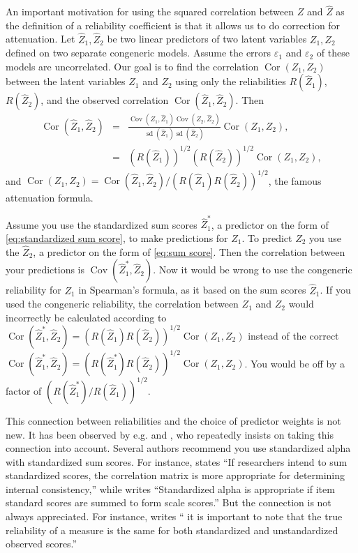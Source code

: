 \documentclass[twoside]{article}
\DeclareMathOperator{\sd}{sd}
\DeclareMathOperator{\Cor}{Cor}
\DeclareMathOperator{\Cov}{Cov}
\renewcommand{\sqrt}[1]{{(#1)^{1/2}}}
\begin{document}
An important motivation for using the squared
correlation between $Z$ and $\hat{Z}$ as the definition of a
reliability coefficient is that it allows us to do correction for
attenuation. Let $\hat{Z}_{1},\hat{Z}_{2}$ be two linear
predictors of two latent variables $Z_{1},Z_{2}$ defined on two separate
congeneric models. Assume the errors $\varepsilon_{1}$ and $\varepsilon_{2}$ of these models
are uncorrelated. Our goal is to find the correlation $\Cor(Z_{1},Z_{2})$
between the latent variables $Z_{1}$ and $Z_{2}$ using only the
reliabilities $ R(\hat{Z}_{1})$, $ R(\hat{Z}_{2})$,
and the observed correlation $\Cor(\hat{Z}_{1},\hat{Z}_{2})$.
Then
\begin{eqnarray*}
\Cor(\hat{Z}_{1},\hat{Z}_{2}) & = & \frac{\Cov(Z_{1},\hat{Z}_{1})\Cov(Z_{2},\hat{Z}_{2})}{\sd(\hat{Z}_{1})\sd(\hat{Z}_{2})}\Cor(Z_{1},Z_{2}),\\
 & = & \sqrt{ R(\hat{Z}_{1})}\sqrt{ R(\hat{Z}_{2})}\Cor(Z_{1},Z_{2}),
\end{eqnarray*}
and $\Cor(Z_{1},Z_{2})=\Cor(\hat{Z}_{1},\hat{Z}_{2})/\sqrt{ R(\hat{Z}_{1}) R(\hat{Z}_{2})}$,
the famous \citet{spearman1904proof} attenuation formula.


Assume you use the standardized sum scores $\hat{Z}_1^*$, a predictor on the form of  \cref{eq:standardized sum score}, to make predictions for $Z_1$. To predict $Z_2$ you use the $\hat{Z}_2$, a predictor on the form of \cref{eq:sum score}. Then the correlation between your predictions is $\Cov(\hat{Z}_1^*,\hat{Z}_2)$. Now it would be wrong to use the congeneric reliability for $Z_1$ in Spearman's formula, as it based on the sum scores $\hat{Z}_1$. If you used the congeneric reliability, the correlation between $Z_1$ and $Z_2$ would incorrectly be calculated according to $\Cor(\hat{Z}_{1}^*,\hat{Z}_{2})= \sqrt{ R(\hat{Z}_{1}) R(\hat{Z}_{2})}\Cor(Z_{1},Z_{2})$
instead of the correct $\Cor(\hat{Z}_{1}^*,\hat{Z}_{2})=\sqrt{ R(\hat{Z}_{1}^{*}) R(\hat{Z}_{2})}\Cor(Z_{1},Z_{2})$.
You would be off by a factor of $\sqrt{ R(\hat{Z}_{1}^{*})/ R(\hat{Z}_{1})}$.

This connection between reliabilities and the choice of predictor
weights is not new. It has been observed by e.g. \citet[][p. 112]{Joreskog1971-nn} and \citet{McNeish2018-vu}, who repeatedly insists on taking this connection into account. Several authors recommend you use standardized alpha with standardized sum scores. For instance, \citet[][p. 451]{Falk2011-ae} states \enquote{If researchers intend to sum
standardized scores, the correlation matrix is more appropriate for determining internal consistency,} while \citet[][p. 99]{Cortina1993-aq} writes \enquote{Standardized alpha is appropriate if item standard scores are summed to form scale scores.} But the connection is not always appreciated. For instance, \citet[][p.348]{Osburn2000-jd} writes
\enquote{\textelp{} it is important to note that the true reliability of a measure is the same for both standardized and unstandardized observed scores.}
\end{document}

